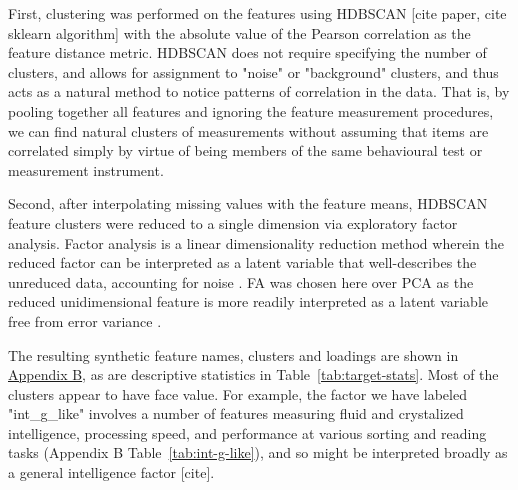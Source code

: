 \documentclass{article}
\begin{document}
First, clustering was performed on the features using HDBSCAN [cite
paper, cite sklearn algorithm] with the absolute value of the Pearson
correlation as the feature distance metric. HDBSCAN does not require
specifying the number of clusters, and allows for assignment to "noise" or
"background" clusters, and thus acts as a natural method to notice patterns
of correlation in the data. That is, by pooling together all features and
ignoring the feature measurement procedures, we can find natural clusters of measurements
without assuming that items are correlated simply by virtue of being members
of the same behavioural test or measurement instrument.

Second, after interpolating missing values with the feature means, HDBSCAN
feature clusters were reduced to a single dimension via exploratory factor
analysis. Factor analysis is a linear dimensionality reduction method wherein
the reduced factor can be interpreted as a latent variable that
well-describes the unreduced data, accounting for noise
\citep{cattellScientificUseFactor1978,childEssentialsFactorAnalysis2006a}. FA
was chosen here over PCA as the reduced unidimensional feature is more
readily interpreted as a latent variable free from error variance
\cite{attiasIndependentFactorAnalysis1999}.

The resulting synthetic feature names, clusters and loadings are shown in
\hyperref[sec:appendix-b]{Appendix B}, as are descriptive statistics in Table~\ref{tab:target-stats}.
Most of the clusters appear to have face value. For example, the factor we
have labeled "int\_g\_like" involves a number of features measuring fluid and
crystalized intelligence, processing speed, and performance at various
sorting and reading tasks (Appendix B Table~\ref{tab:int-g-like}), and so
might be interpreted broadly as a general intelligence factor [cite].
\end{document}
